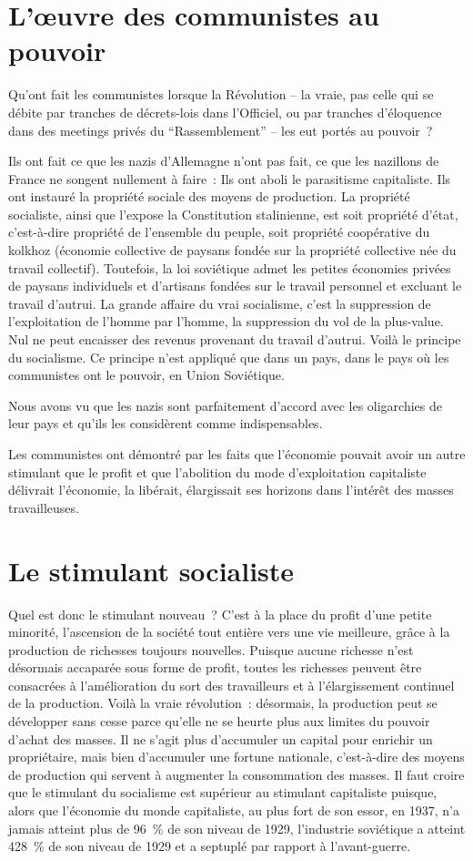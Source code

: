 \documentclass[french,twoside]{book} %
\begin{document}
\section[{L’œuvre des communistes au pouvoir}]{L’œuvre des communistes au pouvoir}
\noindent Qu’ont fait les communistes lorsque la Révolution – la vraie, pas celle qui se débite par tranches de décrets-lois dans l’Officiel, ou par tranches d’éloquence dans des meetings privés du “Rassemblement” – les eut portés au pouvoir ?\par
Ils ont fait ce que les nazis d’Allemagne n’ont pas fait, ce que les nazillons de France ne songent nullement à faire : Ils ont aboli le parasitisme capitaliste. Ils ont instauré la propriété sociale des moyens de production. La propriété socialiste, ainsi que l’expose la Constitution stalinienne, est soit propriété d’état, c’est-à-dire propriété de l’ensemble du peuple, soit propriété coopérative du kolkhoz (économie collective de paysans fondée sur la propriété collective née du travail collectif). Toutefois, la loi soviétique admet les petites économies privées de paysans individuels et d’artisans fondées sur le travail personnel et excluant le travail d’autrui. La grande affaire du vrai socialisme, c’est la suppression de l’exploitation de l’homme par l’homme, la suppression du vol de la plus-value. Nul ne peut encaisser des revenus provenant du travail d’autrui. Voilà le principe du socialisme. Ce principe n’est appliqué que dans un pays, dans le pays où les communistes ont le pouvoir, en Union Soviétique.\par
Nous avons vu que les nazis sont parfaitement d’accord avec les oligarchies de leur pays et qu’ils les considèrent comme indispensables.\par
Les communistes ont démontré par les faits que l’économie pouvait avoir un autre stimulant que le profit et que l’abolition du mode d’exploitation capitaliste délivrait l’économie, la libérait, élargissait ses horizons dans l’intérêt des masses travailleuses.
\section[{Le stimulant socialiste}]{Le stimulant socialiste}
\noindent Quel est donc le stimulant nouveau ? C’est à la place du profit d’une petite minorité, l’ascension de la société tout entière vers une vie meilleure, grâce à la production de richesses toujours nouvelles. Puisque aucune richesse n’est désormais accaparée sous forme de profit, toutes les richesses peuvent être consacrées à l’amélioration du sort des travailleurs et à l’élargissement continuel de la production. Voilà la vraie révolution : désormais, la production peut se développer sans cesse parce qu’elle ne se heurte plus aux limites du pouvoir d’achat des masses. Il ne s’agit plus d’accumuler un capital pour enrichir un propriétaire, mais bien d’accumuler une fortune nationale, c’est-à-dire des moyens de production qui servent à augmenter la consommation des masses. Il faut croire que le stimulant du socialisme est supérieur au stimulant capitaliste puisque, alors que l’économie du monde capitaliste, au plus fort de son essor, en 1937, n’a jamais atteint plus de 96 \% de son niveau de 1929, l’industrie soviétique a atteint 428 \% de son niveau de 1929 et a septuplé par rapport à l’avant-guerre.
\end{document}
